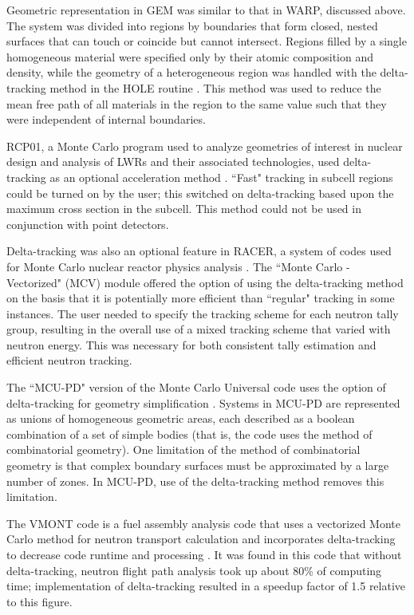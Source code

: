 Geometric representation in GEM was similar to that in WARP, discussed above. The system was divided into
regions by boundaries that form closed, nested surfaces that can touch or coincide but cannot intersect.
Regions filled by a single homogeneous material were specified only by their atomic composition and 
density, while the geometry of a heterogeneous region was handled with the delta-tracking method in the
HOLE routine \cite{wc}. This method was used to reduce the mean free path of all materials in the region
to the same value such that they were independent of internal boundaries.

RCP01, a Monte Carlo program used to analyze geometries of interest in nuclear design and analysis of LWRs
and their associated technologies, used delta-tracking as an optional acceleration method \cite{rcp01}.
``Fast" tracking in subcell regions could be turned on by the user; this switched on delta-tracking based 
upon the maximum cross section in the subcell. This method could not be used in conjunction with point 
detectors.

Delta-tracking was also an optional feature in RACER, a system of codes used for Monte Carlo nuclear 
reactor physics analysis \cite{racer}. The ``Monte Carlo - Vectorized" (MCV) module offered the option of
using the delta-tracking method on the basis that it is potentially more efficient than ``regular" 
tracking in some instances. The user needed to specify the tracking scheme for each neutron tally group, 
resulting in the overall use of a mixed tracking scheme that varied with neutron energy. This was 
necessary for both consistent tally estimation and efficient neutron tracking.

The ``MCU-PD" version of the Monte Carlo Universal code uses the option of delta-tracking for geometry 
simplification \cite{mcu}. Systems in MCU-PD are represented as unions of homogeneous geometric areas, 
each described as a boolean combination of a set of simple bodies (that is, the code uses the method of 
combinatorial geometry). One limitation of the method of combinatorial geometry is that complex boundary
surfaces must be approximated by a large number of zones. In MCU-PD, use of the delta-tracking method
removes this limitation. 

The VMONT code is a fuel assembly analysis code that uses a vectorized Monte Carlo method for neutron 
transport calculation and incorporates delta-tracking to decrease code runtime and processing 
\cite{vmont}. It was found in this code that without delta-tracking, neutron flight path analysis took up
about 80\% of computing time; implementation of delta-tracking resulted in a speedup factor of 1.5
relative to this figure.

